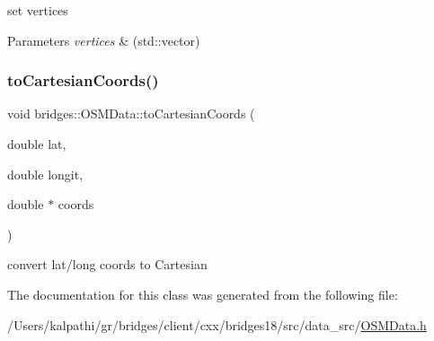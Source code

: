 set vertices


\begin{DoxyParams}{Parameters}
{\em vertices} & (std\+::vector) \\
\hline
\end{DoxyParams}
\mbox{\label{classbridges_1_1_o_s_m_data_a30f6f5c0f20660fdb903bfe6fef4d4e0}} 
\subsubsection{\texorpdfstring{to\+Cartesian\+Coords()}{toCartesianCoords()}}
{\footnotesize\ttfamily void bridges\+::\+O\+S\+M\+Data\+::to\+Cartesian\+Coords (\begin{DoxyParamCaption}\item[{double}]{lat,  }\item[{double}]{longit,  }\item[{double $\ast$}]{coords }\end{DoxyParamCaption})\hspace{0.3cm}{\ttfamily [inline]}}

convert lat/long coords to Cartesian 

The documentation for this class was generated from the following file\+:\begin{DoxyCompactItemize}
\item 
/\+Users/kalpathi/gr/bridges/client/cxx/bridges18/src/data\+\_\+src/\mbox{\hyperlink{_o_s_m_data_8h}{O\+S\+M\+Data.\+h}}\end{DoxyCompactItemize}
